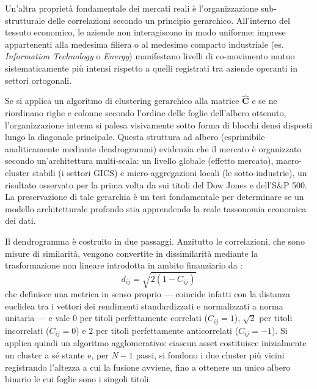 Un'altra proprietà fondamentale dei mercati reali è l'organizzazione sub-strutturale delle correlazioni secondo un principio gerarchico. All'interno del tessuto economico, le aziende non interagiscono in modo uniforme: imprese appartenenti alla medesima filiera o al medesimo comparto industriale (es. \emph{Information Technology} o \emph{Energy}) manifestano livelli di co-movimento mutuo sistematicamente più intensi rispetto a quelli registrati tra aziende operanti in settori ortogonali.

Se si applica un algoritmo di clustering gerarchico alla matrice $\hat{\mathbf{C}}$ e se ne riordinano righe e colonne secondo l'ordine delle foglie dell'albero ottenuto, l'organizzazione interna si palesa visivamente sotto forma di blocchi densi disposti lungo la diagonale principale. Questa struttura ad albero (esprimibile analiticamente mediante dendrogrammi) evidenzia che il mercato è organizzato secondo un'architettura multi-scala: un livello globale (effetto mercato), macro-cluster stabili (i settori GICS) e micro-aggregazioni locali (le sotto-industrie), un risultato osservato per la prima volta da \citet{mantegna1998hierarchical} sui titoli del Dow Jones e dell'S\&P 500. La preservazione di tale gerarchia è un test fondamentale per determinare se un modello architetturale profondo stia apprendendo la reale tassonomia economica dei dati.

Il dendrogramma è costruito in due passaggi. Anzitutto le correlazioni, che sono misure di similarità, vengono convertite in dissimilarità mediante la trasformazione non lineare introdotta in ambito finanziario da \citet{mantegna1998hierarchical}:
\begin{equation}
\label{eq:distanza_metrica}
d_{ij} = \sqrt{2\left(1 - C_{ij}\right)}
\end{equation}
che definisce una metrica in senso proprio --- coincide infatti con la distanza euclidea tra i vettori dei rendimenti standardizzati e normalizzati a norma unitaria --- e vale $0$ per titoli perfettamente correlati ($C_{ij}=1$), $\sqrt{2}$ per titoli incorrelati ($C_{ij}=0$) e $2$ per titoli perfettamente anticorrelati ($C_{ij}=-1$). Si applica quindi un algoritmo agglomerativo: ciascun asset costituisce inizialmente un cluster a sé stante e, per $N-1$ passi, si fondono i due cluster più vicini registrando l'altezza a cui la fusione avviene, fino a ottenere un unico albero binario le cui foglie sono i singoli titoli.

